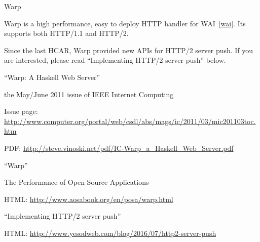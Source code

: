 \begin{hcarentry}[updated]{Warp}
\label{warp}
\makeheader

Warp is a high performance, easy to deploy HTTP handler for WAI~\cref{wai}.
Its supports both HTTP/1.1 and HTTP/2.

Since the last HCAR, Warp provided new APIs for HTTP/2 server push.
If you are interested, please read ``Implementing HTTP/2 server push'' below.

\FurtherReading
\begin{compactitem}
\item``Warp: A Haskell Web Server''
  \begin{compactitem}
  \item the May/June 2011 issue of IEEE Internet Computing
  \item Issue page: \url{http://www.computer.org/portal/web/csdl/abs/mags/ic/2011/03/mic201103toc.htm}
  \item  PDF: \url{http://steve.vinoski.net/pdf/IC-Warp\_a\_Haskell\_Web\_Server.pdf}
  \end{compactitem}
\item ``Warp''
  \begin{compactitem}
  \item The Performance of Open Source Applications
  \item HTML: \url{http://www.aosabook.org/en/posa/warp.html}
  \end{compactitem}
\item ``Implementing HTTP/2 server push''
  \begin{compactitem}
  \item HTML: \url{http://www.yesodweb.com/blog/2016/07/http2-server-push}
  \end{compactitem}
\end{compactitem}
\end{hcarentry}
